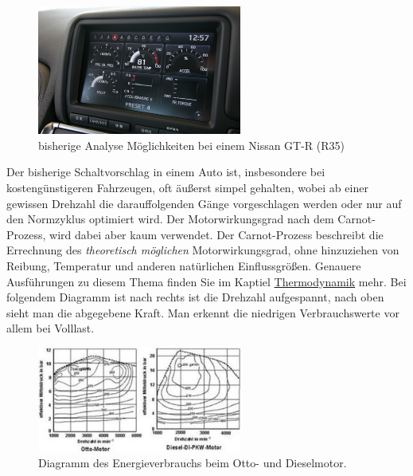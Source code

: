 \begin{figure}[!htb]\centering
	\includegraphics[width=0.6\textwidth]{images/gtrMultifunc}
	\caption{bisherige Analyse Möglichkeiten bei einem Nissan GT-R (R35) \cite{SIMR.CH1-Fahrstil-Analyse.GTRMultifunc}}\label{Fig:imgGTR}
\end{figure}

\newpage
Der bisherige Schaltvorschlag in einem Auto ist, insbesondere bei kostengünstigeren Fahrzeugen, oft äußerst simpel gehalten, wobei ab einer gewissen Drehzahl die darauffolgenden Gänge vorgeschlagen werden oder nur auf den Normzyklus optimiert wird. \cite{SIMR.CH1-Fahrstil-Analyse.Schaltempfehlung} Der Motorwirkungsgrad nach dem Carnot-Prozess, wird dabei aber kaum verwendet. Der Carnot-Prozess beschreibt die Errechnung des \textit{theoretisch möglichen} Motorwirkungsgrad, ohne hinzuziehen von Reibung, Temperatur und anderen natürlichen Einflussgrößen. \cite{SIMR.CH1-Fahrstil-Analyse.CarnotWirkungsgrad} Genauere Ausführungen zu diesem Thema finden Sie im Kaptiel \hyperlink{subsubsection.2.1.2}{Thermodynamik}  mehr. 
Bei folgendem Diagramm ist nach rechts ist die Drehzahl aufgespannt, nach oben sieht man die abgegebene Kraft. Man erkennt die niedrigen Verbrauchswerte vor allem bei Volllast.

\begin{figure}[!htb]\centering
	\includegraphics[width=0.6\textwidth]{images/motorkennfeld}
	\caption{Diagramm des Energieverbrauchs beim Otto- und Dieselmotor. \cite{SIMR.CH1-Fahrstil-Analyse.Motorkennfeld}}\label{Fig:imgMotorkennfeld}
\end{figure}

